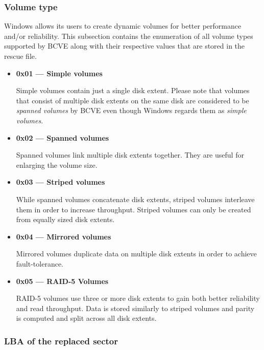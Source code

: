\documentclass[thesis=B,english]{FITthesis}[2012/10/20]
\begin{document}
	\subsubsection{Volume type}
	
	Windows allows its users to create dynamic volumes for better performance and/or reliability. This subsection contains the enumeration of all volume types supported by BCVE along with their respective values that are stored in the rescue file.
	
	\begin{itemize}
		\item \textbf{0x01 --- Simple volumes}
		\nopagebreak
		
		Simple volumes contain just a single disk extent. Please note that volumes that consist of multiple disk extents on the same disk are considered to be \textit{spanned volumes} by BCVE even though Windows regards them as \textit{simple volumes}.
		
		\item \textbf{0x02 --- Spanned volumes} 
		\nopagebreak
		
		Spanned volumes link multiple disk extents together. They are useful for enlarging the volume size.
		
		\item \textbf{0x03 --- Striped volumes} 
		\nopagebreak
		
		While spanned volumes concatenate disk extents, striped volumes interleave them in order to increase throughput. Striped volumes can only be created from equally sized disk extents.
		
		\item \textbf{0x04 --- Mirrored volumes} 
		\nopagebreak
		
		Mirrored volumes duplicate data on multiple disk extents in order to achieve fault-tolerance.
		
		\item \textbf{0x05 --- RAID-5 Volumes} 
		\nopagebreak
		
		RAID-5 volumes use three or more disk extents to gain both better reliability and read throughput. Data is stored similarly to striped volumes and parity is computed and split across all disk extents.
		
	\end{itemize}
	
	\subsubsection{LBA of the replaced sector}
	
\end{document}
